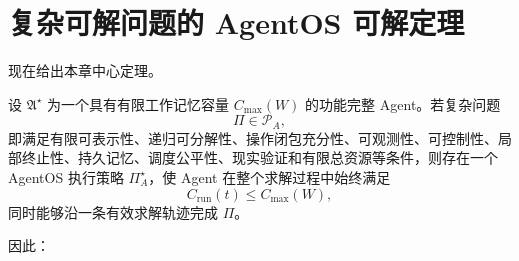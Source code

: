 \section{复杂可解问题的 AgentOS 可解定理}

现在给出本章中心定理。

\begin{theorem}
\label{thm:agentos-solvability}
设 $\mathfrak A^\star$ 为一个具有有限工作记忆容量 $C_{\max}(W)$ 的功能完整 Agent。若复杂问题
\begin{equation}
\Pi\in\mathscr P_A,
\end{equation}
即满足有限可表示性、递归可分解性、操作闭包充分性、可观测性、可控制性、局部终止性、持久记忆、调度公平性、现实验证和有限总资源等条件，则存在一个 AgentOS 执行策略 $\Pi_A^\star$，使 Agent 在整个求解过程中始终满足
\begin{equation}
C_{\mathrm{run}}(t)
\leq
C_{\max}(W),
\end{equation}
同时能够沿一条有效求解轨迹完成 $\Pi$。

因此：
\begin{statementbox}
\centering
{}
\end{statementbox}
\end{theorem}

